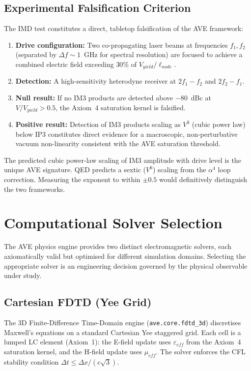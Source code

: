 \subsection{Experimental Falsification Criterion}

The IMD test constitutes a direct, tabletop falsification of the AVE framework:

\begin{enumerate}
    \item \textbf{Drive configuration:} Two co-propagating laser beams at frequencies $f_1, f_2$ (separated by $\Delta f \sim 1$~GHz for spectral resolution) are focused to achieve a combined electric field exceeding $30\%$ of $V_{yield}/\ell_{node}$.
    \item \textbf{Detection:} A high-sensitivity heterodyne receiver at $2f_1 - f_2$ and $2f_2 - f_1$.
    \item \textbf{Null result:} If no IM3 products are detected above $-80$~dBc at $V/V_{yield} > 0.5$, the Axiom~4 saturation kernel is falsified.
    \item \textbf{Positive result:} Detection of IM3 products scaling as $V^3$ (cubic power law) below IP3 constitutes direct evidence for a macroscopic, non-perturbative vacuum non-linearity consistent with the AVE saturation threshold.
\end{enumerate}

\noindent The predicted cubic power-law scaling of IM3 amplitude with drive level is the unique AVE signature. QED predicts a sextic ($V^6$) scaling from the $\alpha^4$ loop correction. Measuring the exponent to within $\pm 0.5$ would definitively distinguish the two frameworks.

\section{Computational Solver Selection}
\label{sec:solver_selection}

The AVE physics engine provides two distinct electromagnetic solvers, each axiomatically valid but optimised for different simulation domains. Selecting the appropriate solver is an engineering decision governed by the physical observable under study.

\subsection{Cartesian FDTD (Yee Grid)}

The 3D Finite-Difference Time-Domain engine (\texttt{ave.core.fdtd\_3d}) discretises Maxwell's equations on a standard Cartesian Yee staggered grid. Each cell is a lumped LC element (Axiom~1): the E-field update uses $\varepsilon_{eff}$ from the Axiom~4 saturation kernel, and the H-field update uses $\mu_{eff}$. The solver enforces the CFL stability condition $\Delta t \leq \Delta x / (c\sqrt{3})$.

